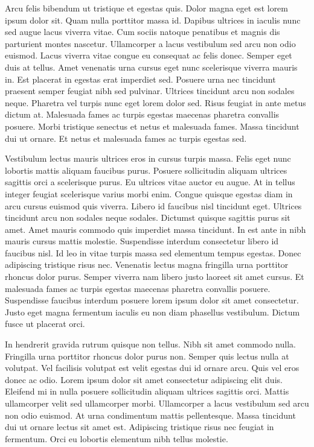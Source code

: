 \documentclass[11pt,a4paper]{article}
\begin{document}
Arcu felis bibendum ut tristique et egestas quis. Dolor magna eget est lorem ipsum dolor sit. Quam nulla porttitor massa id. Dapibus ultrices in iaculis nunc sed augue lacus viverra vitae. Cum sociis natoque penatibus et magnis dis parturient montes nascetur. Ullamcorper a lacus vestibulum sed arcu non odio euismod. Lacus viverra vitae congue eu consequat ac felis donec. Semper eget duis at tellus. Amet venenatis urna cursus eget nunc scelerisque viverra mauris in. Est placerat in egestas erat imperdiet sed. Posuere urna nec tincidunt praesent semper feugiat nibh sed pulvinar. Ultrices tincidunt arcu non sodales neque. Pharetra vel turpis nunc eget lorem dolor sed. Risus feugiat in ante metus dictum at. Malesuada fames ac turpis egestas maecenas pharetra convallis posuere. Morbi tristique senectus et netus et malesuada fames. Massa tincidunt dui ut ornare. Et netus et malesuada fames ac turpis egestas sed.

Vestibulum lectus mauris ultrices eros in cursus turpis massa. Felis eget nunc lobortis mattis aliquam faucibus purus. Posuere sollicitudin aliquam ultrices sagittis orci a scelerisque purus. Eu ultrices vitae auctor eu augue. At in tellus integer feugiat scelerisque varius morbi enim. Congue quisque egestas diam in arcu cursus euismod quis viverra. Libero id faucibus nisl tincidunt eget. Ultrices tincidunt arcu non sodales neque sodales. Dictumst quisque sagittis purus sit amet. Amet mauris commodo quis imperdiet massa tincidunt. In est ante in nibh mauris cursus mattis molestie. Suspendisse interdum consectetur libero id faucibus nisl. Id leo in vitae turpis massa sed elementum tempus egestas. Donec adipiscing tristique risus nec. Venenatis lectus magna fringilla urna porttitor rhoncus dolor purus. Semper viverra nam libero justo laoreet sit amet cursus. Et malesuada fames ac turpis egestas maecenas pharetra convallis posuere. Suspendisse faucibus interdum posuere lorem ipsum dolor sit amet consectetur. Justo eget magna fermentum iaculis eu non diam phasellus vestibulum. Dictum fusce ut placerat orci.

In hendrerit gravida rutrum quisque non tellus. Nibh sit amet commodo nulla. Fringilla urna porttitor rhoncus dolor purus non. Semper quis lectus nulla at volutpat. Vel facilisis volutpat est velit egestas dui id ornare arcu. Quis vel eros donec ac odio. Lorem ipsum dolor sit amet consectetur adipiscing elit duis. Eleifend mi in nulla posuere sollicitudin aliquam ultrices sagittis orci. Mattis ullamcorper velit sed ullamcorper morbi. Ullamcorper a lacus vestibulum sed arcu non odio euismod. At urna condimentum mattis pellentesque. Massa tincidunt dui ut ornare lectus sit amet est. Adipiscing tristique risus nec feugiat in fermentum. Orci eu lobortis elementum nibh tellus molestie.
\end{document}
